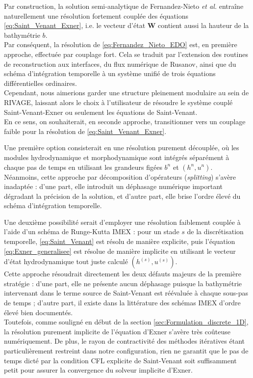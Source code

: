 \documentclass[11pt, a4paper, oneside]{report}
\begin{document}
Par construction, la solution semi-analytique de Fernandez-Nieto \textit{et al.} entraîne naturellement une résolution fortement couplée des équations \eqref{eq:Saint_Venant_Exner}, i.e. le vecteur d'état $\bm{W}$ contient aussi la hauteur de la bathymétrie $b$. \\
Par conséquent, la résolution de \eqref{eq:Fernandez_Nieto_EDO} est, en première approche, effectuée par couplage fort. Cela se traduit par l'extension des routines de reconstruction aux interfaces, du flux numérique de Rusanov, ainsi que du schéma d'intégration temporelle à un système unifié de trois équations différentielles ordinaires. \\
Cependant, nous aimerions garder une structure pleinement modulaire au sein de RIVAGE, laissant alors le choix à l'utilisateur de résoudre le système couplé Saint-Venant-Exner ou seulement les équations de Saint-Venant. \\
En ce sens, on souhaiterait, en seconde approche, transitionner vers un couplage faible pour la résolution de \eqref{eq:Saint_Venant_Exner}.

Une première option consisterait en une résolution purement découplée, où les modules hydrodynamique et morphodynamique sont intégrés séparément à chaque pas de temps en utilisant les grandeurs figées $b^n$ et $(h^n, u^n)$. \\
Néanmoins, cette approche par décomposition d'opérateurs (\textit{splitting}) s'avère inadaptée : d'une part, elle introduit un déphasage numérique important dégradant la précision de la solution, et d'autre part, elle brise l'ordre élevé du schéma d'intégration temporelle.

Une deuxième possibilité serait d'employer une résolution faiblement couplée à l'aide d'un schéma de Runge-Kutta IMEX : pour un stade $s$ de la discrétisation temporelle, \eqref{eq:Saint_Venant} est résolu de manière explicite, puis l'équation \eqref{eq:Exner_generalisee} est résolue de manière implicite en utilisant le vecteur d'état hydrodynamique tout juste calculé $(h^{(s)},u^{(s)})$. \\
Cette approche résoudrait directement les deux défauts majeurs de la première stratégie : d'une part, elle ne présente aucun déphasage puisque la bathymétrie intervenant dans le terme source de Saint-Venant est réévaluée à chaque sous-pas de temps ; d'autre part, il existe dans la littérature des schémas IMEX d'ordre élevé bien documentés. \\
Toutefois, comme souligné en début de la section \ref{sec:Formulation_discrete_1D}, la résolution purement implicite de l'équation d'Exner s'avère très coûteuse numériquement. De plus, le rayon de contractivité des méthodes itératives étant particulièrement restreint dans notre configuration, rien ne garantit que le pas de temps dicté par la condition CFL explicite de Saint-Venant soit suffisamment petit pour assurer la convergence du solveur implicite d'Exner.
\end{document}
